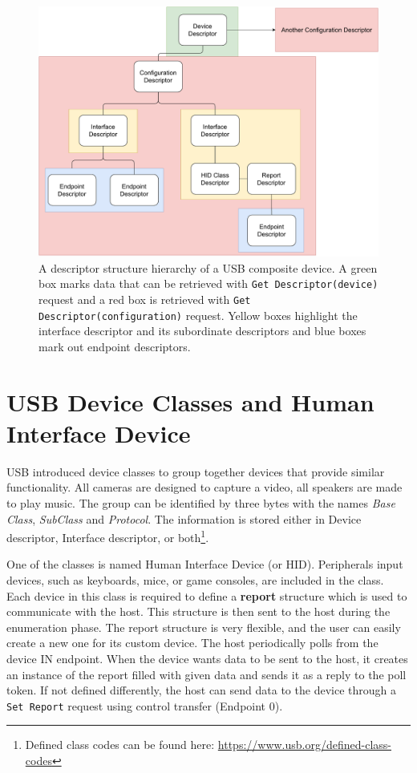 \begin{figure}[ht]
    \centering
    \includegraphics[width=\linewidth]{./obrazky-figures/descriptor_layout.pdf}
    \caption{A descriptor structure hierarchy of a USB composite device. A green box marks data that can be retrieved with \texttt{Get Descriptor(device)} request and a red box is retrieved with \texttt{Get Descriptor(configuration)} request. Yellow boxes highlight the interface descriptor and its subordinate descriptors and blue boxes mark out endpoint descriptors.}
    \label{fig:descriptors}
\end{figure}

\section{USB Device Classes and Human Interface Device}
\label{sec:device_classes_and_hid}
USB introduced device classes to group together devices that provide similar functionality. All cameras are designed to capture a video, all speakers are made to play music. The group can be identified by three bytes with the names \emph{Base Class}, \emph{SubClass} and \emph{Protocol}. The information is stored either in Device descriptor, Interface descriptor, or both\footnote{Defined class codes can be found here: \url{https://www.usb.org/defined-class-codes}}.

One of the classes is named Human Interface Device (or HID). Peripherals input devices, such as keyboards, mice, or game consoles, are included in the class. Each device in this class is required to define a \textbf{report} structure which is used to communicate with the host. This structure is then sent to the host during the enumeration phase. The report structure is very flexible, and the user can easily create a new one for its custom device. The host periodically polls from the device IN endpoint. When the device wants data to be sent to the host, it creates an instance of the report filled with given data and sends it as a reply to the poll token. If not defined differently, the host can send data to the device through a \verb|Set Report| request using control transfer (Endpoint 0).

